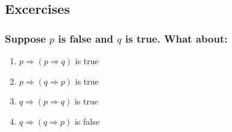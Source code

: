 \subsection{Excercises}
\subsubsection{Suppose $p$ is false and $q$ is true. What about:}
\begin{enumerate}[label=(\alph*)]
    \item $p \Rightarrow (p \Rightarrow q)$ is true
    \item $p \Rightarrow (q \Rightarrow p)$ is true
    \item $q \Rightarrow (p \Rightarrow q)$ is true
    \item $q \Rightarrow (q \Rightarrow p)$ is false
\end{enumerate}